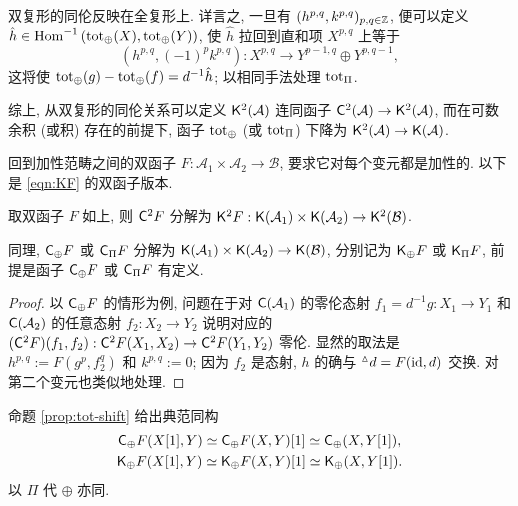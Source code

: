 双复形的同伦反映在全复形上. 详言之, 一旦有 $(h^{p,q}, k^{p,q})_{p,q \in \mathbb{Z}}$, 便可以定义 $\hat{h} \in \operatorname{Hom}^{-1}\left( \operatorname{tot}_{\oplus}(X), \operatorname{tot}_{\oplus}(Y) \right)$, 使 $\hat{h}$ 拉回到直和项 $X^{p,q}$ 上等于
\[ \left( h^{p,q}, (-1)^p k^{p,q} \right): X^{p,q} \to Y^{p-1, q} \oplus Y^{p, q-1}, \]
这将使 $\operatorname{tot}_{\oplus}(g) - \operatorname{tot}_{\oplus}(f) = d^{-1} \hat{h}$; 以相同手法处理 $\operatorname{tot}_{\Pi}$.

综上, 从双复形的同伦关系可以定义 $\mathsf{K}^2(\mathcal{A})$ 连同函子 $\mathsf{C}^2(\mathcal{A}) \to \mathsf{K}^2(\mathcal{A})$, 而在可数余积 (或积) 存在的前提下, 函子 $\operatorname{tot}_{\oplus}$ (或 $\operatorname{tot}_{\Pi}$) 下降为 $\mathsf{K}^2(\mathcal{A}) \to \mathsf{K}(\mathcal{A})$. 

回到加性范畴之间的双函子 $F: \mathcal{A}_1 \times \mathcal{A}_2 \to \mathcal{B}$, 要求它对每个变元都是加性的. 以下是 \eqref{eqn:KF} 的双函子版本.

\begin{proposition}\label{prop:bifunctor-cplx-homotopy}
	取双函子 $F$ 如上, 则 $\mathsf{C}^2 F$ 分解为 $\mathsf{K}^2 F: \mathsf{K}(\mathcal{A}_1) \times \mathsf{K}(\mathcal{A}_2) \to \mathsf{K}^2 (\mathcal{B})$.
	
	同理, $\mathsf{C}_{\oplus} F$ 或 $\mathsf{C}_{\Pi} F$ 分解为 $\mathsf{K}(\mathcal{A}_1) \times \mathsf{K}(\mathcal{A}_2) \to \mathsf{K}(\mathcal{B})$, 分别记为 $\mathsf{K}_{\oplus} F$ 或 $\mathsf{K}_{\Pi} F$, 前提是函子 $\mathsf{C}_{\oplus} F$ 或 $\mathsf{C}_{\Pi} F$ 有定义.
\end{proposition}
\begin{proof}
	以 $\mathsf{C}_{\oplus} F$ 的情形为例, 问题在于对 $\mathsf{C}(\mathcal{A}_1)$ 的零伦态射 $f_1 = d^{-1} g: X_1 \to Y_1$ 和 $\mathsf{C}(\mathcal{A}_2)$ 的任意态射 $f_2: X_2 \to Y_2$ 说明对应的 $(\mathsf{C}^2 F)(f_1, f_2): \mathsf{C}^2 F(X_1, X_2) \to \mathsf{C}^2 F(Y_1, Y_2)$ 零伦. 显然的取法是 $h^{p,q} := F(g^p, f_2^q)$ 和 $k^{p,q} := 0$; 因为 $f_2$ 是态射, $h$ 的确与 ${}^\vartriangle d = F(\mathrm{id}, d)$ 交换. 对第二个变元也类似地处理.
\end{proof}

命题 \ref{prop:tot-shift} 给出典范同构
\begin{gather*}
	\mathsf{C}_{\oplus} F(X[1], Y) \simeq \mathsf{C}_{\oplus}F(X, Y)[1] \simeq \mathsf{C}_{\oplus}(X, Y[1]), \\
	\mathsf{K}_{\oplus} F(X[1], Y) \simeq \mathsf{K}_{\oplus}F(X, Y)[1] \simeq \mathsf{K}_{\oplus}(X, Y[1]).
\end{gather*}
以 $\Pi$ 代 $\oplus$ 亦同.

